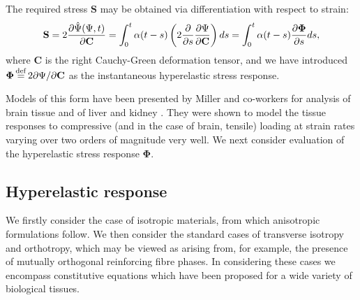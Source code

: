 \bigskip

\noindent The required stress $ \mathbf{S} $ may be obtained via differentiation with respect to strain:
\begin{equation}
\label{chap5:stress}
\mathbf{S} = 2 \dfrac{\partial \hat{\Psi}(\Psi , t)}{\partial \mathbf{C}} = \int_0^t \alpha (t-s) \left( 2 \dfrac{\partial }{\partial s} \dfrac{\partial \Psi}{\partial \mathbf{C}} \right) ds = \int_0^t \alpha (t-s) \dfrac{\partial \boldsymbol \Phi}{\partial s} ds,
\end{equation}
where $ \mathbf{C} $ is the right Cauchy-Green deformation tensor, and we have introduced $ \boldsymbol \Phi \, {\buildrel\rm	def\over=} \, 2 \partial \Psi / \partial \mathbf{C} $ as the instantaneous hyperelastic stress response.

\bigskip

Models of this form have been presented by Miller and co-workers for analysis of brain tissue \citep{Miller97,Miller02} and of liver and kidney \citep{Miller00}. They were shown to model the tissue responses to compressive (and in the case of brain, tensile) loading at strain rates varying over two orders of magnitude very well. We next consider evaluation of the hyperelastic stress response $ \boldsymbol \Phi $.

	\subsection{Hyperelastic response}
We firstly consider the case of isotropic materials, from which anisotropic formulations follow. We then consider the standard cases of transverse isotropy and orthotropy, which may be viewed as arising from, for example, the presence of mutually orthogonal reinforcing fibre phases. In considering these cases we encompass constitutive equations which have been proposed for a wide variety of biological tissues.
	
